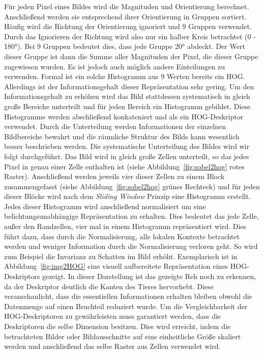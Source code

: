 Für jeden Pixel eines Bildes wird die Magnituden und Orientierung berechnet. Anschließend werden sie entsprechend ihrer Orientierung in Gruppen sortiert. Häufig wird die Richtung der Orientierung ignoriert und 9 Gruppen verwendet. Durch das Ignorieren der Richtung wird also nur ein halber Kreis betrachtet (0 - 180°). Bei 9 Gruppen bedeutet dies, dass jede Gruppe 20° abdeckt. Der Wert dieser Gruppe ist dann die Summe aller Magnituden der Pixel, die dieser Gruppe zugewiesen wurden. Es ist jedoch auch möglich andere Einteilungen zu verwenden. 
Formal ist ein solche Histogramm aus 9 Werten bereits ein HOG. Allerdings ist der Informationsgehalt dieser Repräsentation sehr gering. Um den Informationsgehalt zu erhöhen wird das Bild stattdessen systematisch in gleich große Bereiche unterteilt und für jeden Bereich ein Histogramm gebildet. Diese Histogramme werden abschließend konkateniert und als ein HOG-Deskriptor verwendet. Durch die Unterteilung werden Informationen der einzelnen Bildbereiche bewahrt und die räumliche Struktur des Bilds kann wesentlich besser beschrieben werden. Die systematische Unterteilung des Bildes wird wir folgt durchgeführt. Das Bild wird in gleich große Zellen unterteilt, so das jedes Pixel in genau einer Zelle enthalten ist (siehe Abbildung~\ref{fig:sobel2hog} rotes Raster). Anschließend werden jeweils vier dieser Zellen zu einem Block zusammengefasst (siehe Abbildung~\ref{fig:sobel2hog} grünes Rechteck) und für jeden dieser Blöcke wird nach dem \textit{Sliding Window} Prinzip eine Histogramm erstellt. Jedes dieser Histogramm wird anschließend normalisiert um eine belichtungsunabhängige Repräsentation zu erhalten. Dies bedeutet das jede Zelle, außer den Randzellen, vier mal in einem Histogramm repräsentiert wird. Dies führt dazu, dass durch die Normalisierung, alle lokalen Kontexte betrachtet werden und weniger Information durch die Normalisierung verloren geht. So wird zum Beispiel die Invarianz zu Schatten im Bild erhöht. 
Exemplarisch ist in Abbildung~\ref{fig:img2HOG} eine visuell aufbereitete Repräsentation eines HOG-Deskriptors gezeigt. In dieser Darstellung ist das gezeigte Reh noch zu erkennen, da der Deskriptor deutlich die Kanten des Tieres hervorhebt. Diese veranschaulicht, dass die essentiellen Informationen erhalten bleiben obwohl die Datenmenge auf einen Bruchteil reduziert wurde. Um die Vergleichbarkeit der HOG-Deskriptoren zu gewährleisten muss garantiert werden, dass die Deskriptoren die selbe Dimension besitzen. Dies wird erreicht, indem die betrachteten Bilder oder Bildausschnitte auf eine einheitliche Größe skaliert werden und anschließend das selbe Raster aus Zellen verwendet wird.  \cite{dalal05}\cite{HOG1}
